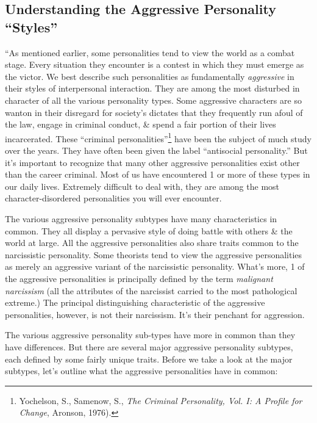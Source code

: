 \documentclass{article}
\numberwithin{equation}{section}
\begin{document}
\subsection{Understanding the Aggressive Personality ``Styles''}
``As mentioned earlier, some personalities tend to view the world as a combat stage. Every situation they encounter is a contest in which they must emerge as the victor. We best describe such personalities as fundamentally \textit{aggressive} in their styles of interpersonal interaction. They are among the most disturbed in character of all the various personality types. Some aggressive characters are so wanton in their disregard for society's dictates that they frequently run afoul of the law, engage in criminal conduct, \& spend a fair portion of their lives incarcerated. These ``criminal personalities''\footnote{Yochelson, S., Samenow, S., \textit{The Criminal Personality, Vol. I: A Profile for Change}, Aronson, 1976).} have been the subject of much study over the years. They have often been given the label ``antisocial personality.'' But it's important to recognize that many other aggressive personalities exist other than the career criminal. Most of us have encountered 1 or more of these types in our daily lives. Extremely difficult to deal with, they are among the most character-disordered personalities you will ever encounter.

The various aggressive personality subtypes have many characteristics in common. They all display a pervasive style of doing battle with others \& the world at large. All the aggressive personalities also share traits common to the narcissistic personality. Some theorists tend to view the aggressive personalities as merely an aggressive variant of the narcissistic personality. What's more, 1 of the aggressive personalities is principally defined by the term \textit{malignant narcissism} (all the attributes of the narcissist carried to the most pathological extreme.) The principal distinguishing characteristic of the aggressive personalities, however, is not their narcissism. It's their penchant for aggression.

The various aggressive personality sub-types have more in common than they have differences. But there are several major aggressive personality subtypes, each defined by some fairly unique traits. Before we take a look at the major subtypes, let's outline what the aggressive personalities have in common:
\end{document}
